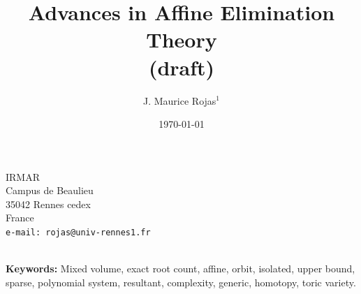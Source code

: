 \makeatother
\newcommand{\Sn}{{\cal S}^{n-1}}
\newcommand{\Zn}{\Z^n}
\newcommand{\Qn}{\Q^n}
\newcommand{\Rn}{\R^n}
\newcommand{\sln}{{\bf S}{\bf L}_n}
\newcommand{\slnr}{\sln(\R)}
\newcommand{\Cn}{\C^n}
\newcommand{\Cs}{\C^*}
\newcommand{\Ks}{K^*}
\newcommand{\Kn}{K^n}
\newcommand{\Knh}{\Kn \! \setminus \! \cH}
\newcommand{\Kni}{\Kn\!\setminus\!\hyp(I)} 
\newcommand{\Rsn}{{(\R^*)}^n}
\newcommand{\Csn}{{(\C^*)}^n}
\newcommand{\Ksn}{{(K^*)}^n}
\newcommand{\Krn}{(K^*)^r \! \times \! K^{n-r}}
\newcommand{\cL}{{\cal L}}
\newcommand{\cM}{{\cal M}}
\newcommand{\cSM}{{\cal SM}}
\newcommand{\cQ}{{\cal Q}}
\newcommand{\cC}{{\cal C}}
\newcommand{\cF}{{\cal F}}
\newcommand{\tF}{\widetilde{F}}
\newcommand{\cT}{{\cal T}}
\newcommand{\bO}{{\bf O}}
\newcommand{\qed}{\rule{1.5ex}{1.5ex}}



\newcommand{\levela}{section }
\newcommand{\levelap}{section. }
\newcommand{\levelsa}{sections }
\newcommand{\Levela}{Section }
\newcommand{\Levelsa}{Sections }

\title{Advances in Affine Elimination Theory\\ (draft)} 
\author{J. Maurice Rojas$^1$}
\date{\today}
\maketitle
\begin{center}
IRMAR\\
Campus de Beaulieu\\
35042 Rennes cedex\\
France\\
{\tt e-mail: rojas@univ-rennes1.fr}
\mbox{}\\
\mbox{}\\
\end{center}

\noindent
{\bf Keywords:}\/ Mixed volume, exact root count, affine, orbit, isolated, 
upper bound, sparse, polynomial system, resultant, complexity, generic, 
homotopy, toric variety. 

